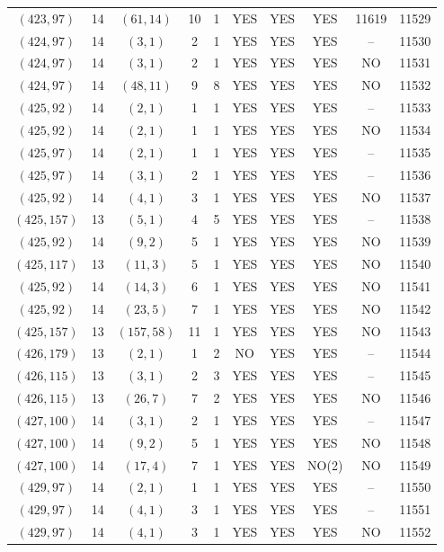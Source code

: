 \begin{longtable}{|c|c|c|c|c|c|c|c|c|c|}
$(423, 97)$ & 14 & $(61, 14)$ & 10 & 1 & YES & YES & YES & 11619 & 11529\\
$(424, 97)$ & 14 & $(3, 1)$ & 2 & 1 & YES & YES & YES & -- & 11530\\
$(424, 97)$ & 14 & $(3, 1)$ & 2 & 1 & YES & YES & YES & NO & 11531\\
$(424, 97)$ & 14 & $(48, 11)$ & 9 & 8 & YES & YES & YES & NO & 11532\\
$(425, 92)$ & 14 & $(2, 1)$ & 1 & 1 & YES & YES & YES & -- & 11533\\
$(425, 92)$ & 14 & $(2, 1)$ & 1 & 1 & YES & YES & YES & NO & 11534\\
$(425, 97)$ & 14 & $(2, 1)$ & 1 & 1 & YES & YES & YES & -- & 11535\\
$(425, 97)$ & 14 & $(3, 1)$ & 2 & 1 & YES & YES & YES & -- & 11536\\
$(425, 92)$ & 14 & $(4, 1)$ & 3 & 1 & YES & YES & YES & NO & 11537\\
$(425, 157)$ & 13 & $(5, 1)$ & 4 & 5 & YES & YES & YES & -- & 11538\\
$(425, 92)$ & 14 & $(9, 2)$ & 5 & 1 & YES & YES & YES & NO & 11539\\
$(425, 117)$ & 13 & $(11, 3)$ & 5 & 1 & YES & YES & YES & NO & 11540\\
$(425, 92)$ & 14 & $(14, 3)$ & 6 & 1 & YES & YES & YES & NO & 11541\\
$(425, 92)$ & 14 & $(23, 5)$ & 7 & 1 & YES & YES & YES & NO & 11542\\
$(425, 157)$ & 13 & $(157, 58)$ & 11 & 1 & YES & YES & YES & NO & 11543\\
$(426, 179)$ & 13 & $(2, 1)$ & 1 & 2 & NO & YES & YES & -- & 11544\\
$(426, 115)$ & 13 & $(3, 1)$ & 2 & 3 & YES & YES & YES & -- & 11545\\
$(426, 115)$ & 13 & $(26, 7)$ & 7 & 2 & YES & YES & YES & NO & 11546\\
$(427, 100)$ & 14 & $(3, 1)$ & 2 & 1 & YES & YES & YES & -- & 11547\\
$(427, 100)$ & 14 & $(9, 2)$ & 5 & 1 & YES & YES & YES & NO & 11548\\
$(427, 100)$ & 14 & $(17, 4)$ & 7 & 1 & YES & YES & NO(2) & NO & 11549\\
$(429, 97)$ & 14 & $(2, 1)$ & 1 & 1 & YES & YES & YES & -- & 11550\\
$(429, 97)$ & 14 & $(4, 1)$ & 3 & 1 & YES & YES & YES & -- & 11551\\
$(429, 97)$ & 14 & $(4, 1)$ & 3 & 1 & YES & YES & YES & NO & 11552\\

\end{longtable}
